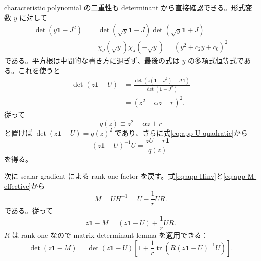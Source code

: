 \documentclass[a4paper,11pt]{ltjsreport}
\newcommand{\tr}{\operatorname{tr}}
\newcommand{\Id}{\mathbf 1}
\begin{document}
characteristic polynomial の二重性も determinant から直接確認できる。形式変数 $y$ に対して
\begin{align}
 \det(y\Id-J^2)
 &=\det(\sqrt y\Id-J)\det(\sqrt y\Id+J)\nonumber\\
 &=\chi_J(\sqrt y)\chi_J(-\sqrt y)
 =\left(y^2+c_2y+c_0\right)^2
 \label{eq:app-J2-square}
\end{align}
である。平方根は中間的な書き方に過ぎず、最後の式は $y$ の多項式恒等式である。これを使うと
\begin{align}
 \det(z\Id-U)
 &=\frac{\det\!\left(z(\Id-J^2)-\Delta\Id\right)}{\det(\Id-J^2)}\nonumber\\
 &=\left(z^2-\alpha z+r\right)^2.
 \label{eq:app-U-char}
\end{align}
従って
\begin{equation}
 q(z)\equiv z^2-\alpha z+r
 \label{eq:app-q}
\end{equation}
と置けば $\det(z\Id-U)=q(z)^2$ であり、さらに式\eqref{eq:app-U-quadratic}から
\begin{equation}
 (z\Id-U)^{-1}U=\frac{zU-r\Id}{q(z)}
 \label{eq:app-U-resolvent-rigorous}
\end{equation}
を得る。

次に scalar gradient による rank-one factor を戻す。式\eqref{eq:app-Hinv}と\eqref{eq:app-M-effective}から
\begin{equation}
 M=UH^{-1}=U-\frac1rUR.
 \label{eq:app-M-rank-one}
\end{equation}
である。従って
\begin{equation}
 z\Id-M=(z\Id-U)+\frac1rUR.
\end{equation}
$R$ は rank one なので matrix determinant lemma を適用できる：
\begin{equation}
 \det(z\Id-M)
 =\det(z\Id-U)
 \left[1+\frac1r\tr\!\left(R(z\Id-U)^{-1}U\right)\right].
 \label{eq:app-detlemma-char}
\end{equation}
\end{document}
